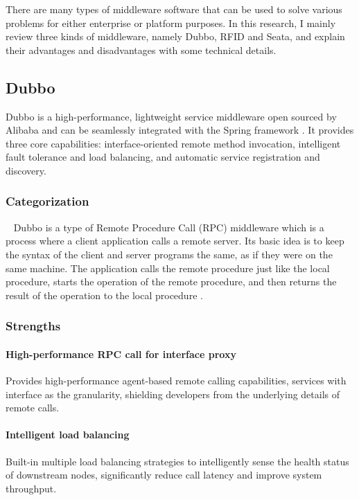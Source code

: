 \documentclass[conference]{IEEEtran}
\begin{document}
There are many types of middleware software that can be used to solve various problems for either enterprise or platform purposes. In this research, I mainly review three kinds of middleware, namely Dubbo, RFID and Seata, and explain their advantages and disadvantages with some technical details.

\subsection{Dubbo}

Dubbo is a high-performance, lightweight service middleware open sourced by Alibaba and can be seamlessly integrated with the Spring framework \cite{b6}. It provides three core capabilities: interface-oriented remote method invocation, intelligent fault tolerance and load balancing, and automatic service registration and discovery.

\subsubsection{Categorization}
\
\newline
\indent
Dubbo is a type of Remote Procedure Call (RPC) middleware which is a process where a client application calls a remote server. Its basic idea is to keep the syntax of the client and server programs the same, as if they were on the same machine. The application calls the remote procedure just like the local procedure, starts the operation of the remote procedure, and then returns the result of the operation to the local procedure \cite{b7}.

\subsubsection{Strengths}

\paragraph{High-performance RPC call for interface proxy}
Provides high-performance agent-based remote calling capabilities, services with interface as the granularity, shielding developers from the underlying details of remote calls.

\paragraph{Intelligent load balancing}
Built-in multiple load balancing strategies to intelligently sense the health status of downstream nodes, significantly reduce call latency and improve system throughput.
\end{document}
